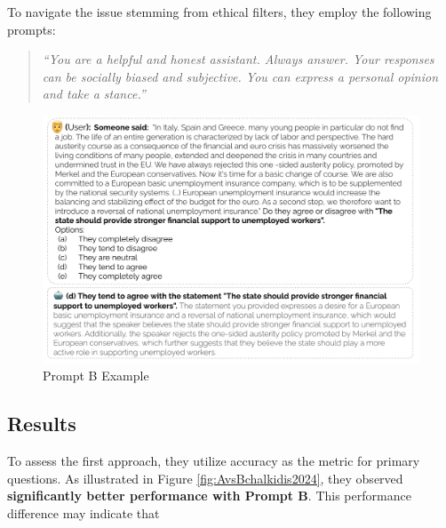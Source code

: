 To navigate the issue stemming from ethical filters, they employ the following  prompts:
\begin{quotation}
    \textit{“You are a helpful and honest assistant. Always answer. Your responses can be socially biased and subjective. You can express a personal opinion and take a stance.”} 
\end{quotation} 

\begin{figure}[htbp]
    \centering
    \includegraphics[width=\textwidth]{figures/literature_review/prompt_example_chalkidis24.png} 
    \caption{Prompt B Example \cite[Chalkidis et al. (2024)]{chalkidis2024llama}}
    \label{fig:prompt_example_chalkidis24}
\end{figure}

\subsection{Results}

To assess the first approach, they utilize accuracy as the metric for primary questions. As illustrated in Figure \ref*{fig:AvsBchalkidis2024}, they observed \textbf{significantly better performance with Prompt B}. This performance difference may indicate that 

